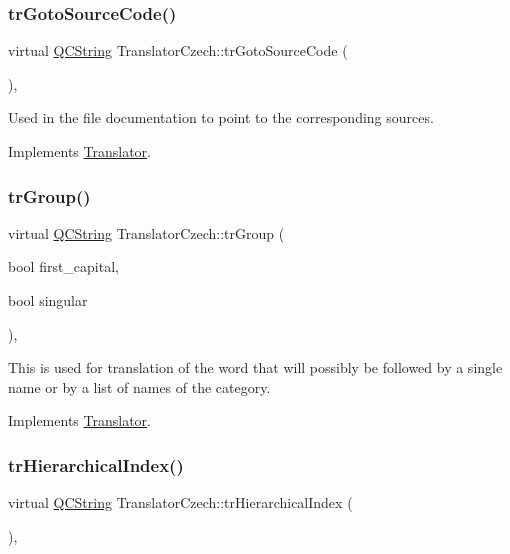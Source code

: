 \subsubsection{\texorpdfstring{trGotoSourceCode()}{trGotoSourceCode()}}
{\footnotesize\ttfamily virtual \mbox{\hyperlink{class_q_c_string}{Q\+C\+String}} Translator\+Czech\+::tr\+Goto\+Source\+Code (\begin{DoxyParamCaption}{ }\end{DoxyParamCaption})\hspace{0.3cm}{\ttfamily [inline]}, {\ttfamily [virtual]}}

Used in the file documentation to point to the corresponding sources. 

Implements \mbox{\hyperlink{class_translator}{Translator}}.

\mbox{\label{class_translator_czech_a4784647c17cdbf33aed76bc01c500eb2}} 
\subsubsection{\texorpdfstring{trGroup()}{trGroup()}}
{\footnotesize\ttfamily virtual \mbox{\hyperlink{class_q_c_string}{Q\+C\+String}} Translator\+Czech\+::tr\+Group (\begin{DoxyParamCaption}\item[{bool}]{first\+\_\+capital,  }\item[{bool}]{singular }\end{DoxyParamCaption})\hspace{0.3cm}{\ttfamily [inline]}, {\ttfamily [virtual]}}

This is used for translation of the word that will possibly be followed by a single name or by a list of names of the category. 

Implements \mbox{\hyperlink{class_translator}{Translator}}.

\mbox{\label{class_translator_czech_a67cef970a7460c4d681a33f55a068d46}} 
\subsubsection{\texorpdfstring{trHierarchicalIndex()}{trHierarchicalIndex()}}
{\footnotesize\ttfamily virtual \mbox{\hyperlink{class_q_c_string}{Q\+C\+String}} Translator\+Czech\+::tr\+Hierarchical\+Index (\begin{DoxyParamCaption}{ }\end{DoxyParamCaption})\hspace{0.3cm}{\ttfamily [inline]}, {\ttfamily [virtual]}}

